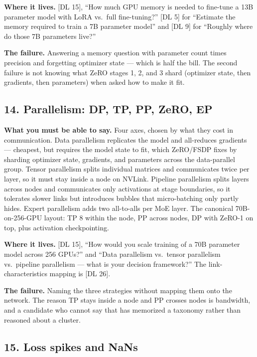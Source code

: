 \textbf{Where it lives.} [DL 15], ``How much GPU memory is needed to fine-tune a 13B parameter model with LoRA vs.\ full fine-tuning?'' [DL 5] for ``Estimate the memory required to train a 7B parameter model'' and [DL 9] for ``Roughly where do those 7B parameters live?''

\textbf{The failure.} Answering a memory question with parameter count times precision and forgetting optimizer state --- which is half the bill. The second failure is not knowing what ZeRO stages 1, 2, and 3 shard (optimizer state, then gradients, then parameters) when asked how to make it fit.

\subsection*{14. Parallelism: DP, TP, PP, ZeRO, EP}

\textbf{What you must be able to say.} Four axes, chosen by what they cost in communication. Data parallelism replicates the model and all-reduces gradients --- cheapest, but requires the model state to fit, which ZeRO/FSDP fixes by sharding optimizer state, gradients, and parameters across the data-parallel group. Tensor parallelism splits individual matrices and communicates twice per layer, so it must stay inside a node on NVLink. Pipeline parallelism splits layers across nodes and communicates only activations at stage boundaries, so it tolerates slower links but introduces bubbles that micro-batching only partly hides. Expert parallelism adds two all-to-alls per MoE layer. The canonical 70B-on-256-GPU layout: TP 8 within the node, PP across nodes, DP with ZeRO-1 on top, plus activation checkpointing.

\textbf{Where it lives.} [DL 15], ``How would you scale training of a 70B parameter model across 256 GPUs?'' and ``Data parallelism vs.\ tensor parallelism vs.\ pipeline parallelism --- what is your decision framework?'' The link-characteristics mapping is [DL 26].

\textbf{The failure.} Naming the three strategies without mapping them onto the network. The reason TP stays inside a node and PP crosses nodes is bandwidth, and a candidate who cannot say that has memorized a taxonomy rather than reasoned about a cluster.

\subsection*{15. Loss spikes and NaNs}


